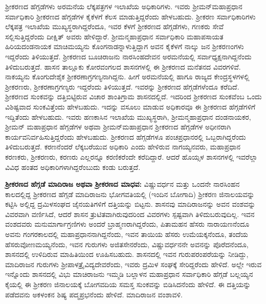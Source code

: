 ಶ‍್ರೀಕರಣದ ಹೆಗ್ಗಡೆಗಳು ಅರಮನೆಯ ಲೆಕ್ಕಪತ್ರಗಳ ಇಲಾಖೆಯ ಅಧಿಕಾರಿಗಳು. ಇವರು ಶ‍್ರೀಮನ್​ಮಹಾಪ್ರಧಾನ ಸರ್ವಾಧಿಕಾರಿ ಶ‍್ರೀಕರಣದ ಹೆಗ್ಗಡೆಗಳ ಕೈಕೆಳಗೆ ಕೆಲಸ ಮಾಡುತ್ತಿದ್ದರೆಂದು ಹೇಳಬಹುದು. ಶ‍್ರೀಕರಣ ಸರ್ವಾಧಿಕಾರಿಗಳು ಲೆಕ್ಕಪತ್ರ ಇಲಾಖೆಯ ಮುಖ್ಯಸ್ಥರಾಗಿದ್ದರೆಂದೂ, ಇವರ ಕೆಳಗೆ ಶ‍್ರೀಕರಣದ ಹೆಗ್ಗಡೆಗಳು, ಗಣಕರು ಸೇವೆ ಸಲ್ಲಿಸುತ್ತಿದ್ದರೆಂದು ದೀಕ್ಷಿತ್​ ಅವರು ಹೇಳಿದ್ದಾರೆ. ಶ‍್ರೀಮನ್ಮಹಾಪ್ರಧಾನ ಸರ್ವಾಧಿಕಾರಿ ಮಹಾಪಸಾಯತ ಹಿರಿಯದಂಡನಾಯಕ ಮಾಚಿಮಯ್ಯನು ಕೊಂಗನಾಡನ್ನಾಳುತ್ತಿದ್ದಾಗ ಅವನ ಕೈಕೆಳಗೆ ನಾಲ್ಕು ಜನ ಶ‍್ರೀಕರಣಂಗಳು ಇದ್ದರೆಂದು ತಿಳಿಯುತ್ತದೆ. ಶ‍್ರೀಕರಣದ ಬೂಚಿರಾಜನು ನಾರಸಿಂಹದೇವನ ಅರಮನೆಯಲ್ಲಿ ಸರ್ವಾಧ್ಯಕ್ಷನಾಗಿದ್ದನೆಂದು ತಿಳಿದುಬರುತ್ತದೆ. ಹಾಸನ ತಾಲ್ಲೂಕು ಕೋರವಂಗಲದ ಶಾಸನಗಳಲ್ಲಿ ಈ ಶ‍್ರೀಕರಣದ ಮನೆತನದ ವಿವರಗಳಿವೆ. ನಾಕಯ್ಯನು ಕೊಂಗುದೇಶೈಕ ಶ‍್ರೀಕರಣಾಗ್ರಗಣ್ಯ\-ನಾಗಿದ್ದನು. ಹೀಗೆ ಅರಮನೆಯಲ್ಲಿ ಹಾಗೂ ರಾಜ್ಯದ ಕೇಂದ್ರಸ್ಥಳಗಳಲ್ಲಿ ಶ‍್ರೀಕರಣರು, ಶ‍್ರೀಕರಣಾಗ್ರಗಣ್ಯರು ಇದ್ದರೆಂದು ತಿಳಿಯುತ್ತದೆ. ಇವರನ್ನು ಶ‍್ರೀಕರಣದ ಹೆಗ್ಗಡೆಗಳೆಂದೂ ಕರೆದಿದೆ. ಶ‍್ರೀಕರಣದ ಸುಂಕವನ್ನು ದತ್ತಿಬಿಟ್ಟಿರುವ ವಿಚಾರ ಶಾಂತಿಗ್ರಾಮ ಶಾಸನದಲ್ಲಿದೆ. ಇದರಿಂದ ಶ‍್ರೀಕರಣದ ಸುಂಕವೆಂಬ ಒಂದು ವಿಶಿಷ್ಟವಾದ ಸುಂಕವಿತ್ತೆಂದು ಹೇಳಬಹುದು. ಇದನ್ನು ವಸೂಲು ಮಾಡುವ ಅಧಿಕಾರವೂ ಈ ಶ‍್ರೀಕರಣದ ಹೆಗ್ಗಡೆಗಳಿಗೆ ಇದ್ದಿತೆಂದು ಹೇಳಬಹುದು. ಇವರು ಹಣಕಾಸಿನ ಇಲಾಖೆಯ ಮುಖ್ಯಸ್ಥರಾಗಿ, ಶ‍್ರೀಮನ್ಮಹಾಪ್ರಧಾನ ದಂಡನಾಯಕರ, ಶ‍್ರೀಮನ್​ ಮಹಾಪ್ರಧಾನ ಹೆಗ್ಗಡೆಗಳ ಅಥವಾ ಶ‍್ರೀಮನ್​ಮಹಾಪ್ರಧಾನ ಶ‍್ರೀಕರಣದ ಹೆಗ್ಗಡೆಗಳ ಅಧೀನರಾಗಿ ಕಾರ್ಯವನಿರ್ವಹಿಸುತ್ತಿದ್ದರೆಂದು ಹೇಳಬಹುದು. ಶ‍್ರೀಕರಣದ ಹೆಗ್ಗಡೆಗಳೂ ಪಂಚಪ್ರಧಾನರಲ್ಲಿ ಒಬ್ಬರಾಗಿದ್ದರೆಂದು ತಿಳಿದುಬರುತ್ತದೆ. ಕರಣನೆಂದರೆ ಲೆಕ್ಕಬರೆಯುವ ಅಧಿಕಾರಿ ಎಂದು ಹೇಳಿರುವ ನಾಗಯ್ಯನವರು, ಮಹಾಪ್ರಧಾನ ಕರಣಕರು, ಶ‍್ರೀಕರಣರು, ಕರಣರು ಎಲ್ಲರನ್ನೂ ಕರಣಿಕರೆಂದೇ ಕರೆದಿದ್ದಾರೆ. ಆದರೆ ಹೊಯ್ಸಳ ಶಾಸನಗಳಲ್ಲಿ ಇವರೆಲ್ಲಾ ವಿವಿಧ ಹಂತದ ಅಧಿಕಾರಿಗಳಾಗಿದ್ದ\-ರೆಂಬುದು ಕಂಡು ಬರುತ್ತದೆ.

\textbf{ಶ‍್ರೀಕರಣದ ಹೆಗ್ಗಡೆ ಮಾದಿರಾಜ ಅಥವಾ ಶ‍್ರೀಕರಣದ ಮಾಧವ:} ವಿಷ್ಣುವರ್ಧನ ಮತ್ತು ಒಂದನೇ ನಾರಸಿಂಹನ ಕಾಲದಲ್ಲಿದ್ದ ಶ‍್ರೀಕರಣದ ಹೆಗ್ಗಡೆ ಮಾದಿರಾಜನು ಭೋಗವತಿಯಲ್ಲಿ (ಇಂದಿನ ಬೋಗಾದಿ) ಶ‍್ರೀಕರಣ ಜಿನಾಲಯವನ್ನು ಕಟ್ಟಿಸಿ ಅಲ್ಲಿದ್ದ ದ್ರಮಿಳಸಂಘದ ಜೈನಯತಿಗಳಿಗೆ ದತ್ತಿಯನ್ನು ಬಿಟ್ಟನು. ಶಾಸನವು ಮಾದಿರಾಜನನ್ನು ಅವನ ವಂಶವನ್ನು ವಿವರವಾಗಿ ವರ್ಣಿಸಿದೆ, ಆದರೆ ಶಾಸನ ತ್ರುಟಿತವಾಗಿರುವುದರಿಂದ ವಿವರಗಳು ಸ್ಪಷ್ಟವಾಗಿ ತಿಳಿದುಬರುವುದಿಲ್ಲ. ಇವನ ವಂಶದವರು ಮನುಮಾರ್ಗಾಗ್ರಣಿಗಳು ಅಂದರೆ ಬ್ರಾಹ್ಮಣರಾಗಿದ್ದರೆಂದು, ಪಿತಾಮಹನ ಹೆಸರು ನಾರಾಯಣನೆಂದೂ ಅವನು ಗಂಗರಕಾಲದಲ್ಲಿ ಮಹಾಪ್ರಧಾನನಾಗಿದ್ದನೆಂದು, ಇವನ ತಾಯಿಯ ಹೆಸರು ಉಮೆಯಕ್ಕನೆಂದೂ, ತಂದೆಯ ಹೆಸರು\break ವೋಣಮಯ್ಯನೆಂದು, ಇವನ ಗುರುಗಳು ಅಜಿತಸೇನರೆಂದು, ವಿಷ್ಣುವರ್ಧನನೇ ಅವನನ್ನು ಪೊರೆದನೆಂದೂ, ಶಾಸನದಲ್ಲಿ ಉಳಿದಿರುವ ಮಾಹಿತಿಯಿಂದ ಊಹಿಸಬಹುದು. ಶಾಸನದಲ್ಲಿ ಇವನ ಗುರುಪರಂಪರೆಯನ್ನು ನೀಡಿದ್ದು, ಮಾದಿರಾಜನ ಗುರುಗಳು ಶ‍್ರೀಪಾಳತ್ರೈವಿದ್ಯದೇವರೆಂದು, ಇವರು ದ್ರಮಿಳ ಸಂಘಕ್ಕೆ ಸೇರಿದ್ದರೆಂದು ಹೇಳಿದೆ. ಅಲ್ಲೇ ಇರುವ ಇನ್ನೊಂದು ಶಾಸನದಲ್ಲಿ ವಿಭು ಮಾಚಿರಾಜನು ಇಮ್ಮಡಿ ಬಲ್ಲಾಳನ ಮಹಾಪ್ರಧಾನ ಸರ್ವಾಧಿಕಾರಿ ಹೆಗ್ಗಡೆ ಬಲ್ಲಯ್ಯನ ಕೈಯಲ್ಲಿ ಈ ಶ‍್ರೀಕರಣ ಜಿನಾಲಯಕ್ಕೆ ಬೋಗವದಿಯ ಸಮಸ್ತ ಸುಂಕವನ್ನು ಬಿಡಿಸಿದನೆಂದು ಹೇಳಿದೆ. ಈ ದತ್ತಿಯನ್ನು ಪಡೆದವನು ಅಕಳಂಕನ ಶಿಷ್ಯ ಪದ್ಮಪ್ರಭನೆಂದು ಹೇಳಿದೆ. ಮಾದಿರಾಜನ ವಂಶಾವಳಿ.

